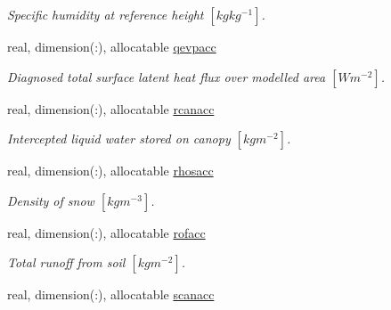 \begin{DoxyCompactItemize}
\begin{DoxyCompactList}\small\item\em Specific humidity at reference height $[kg kg^{-1} ]$. \end{DoxyCompactList}\item 
\hypertarget{structclass__statevars_1_1class__rotated_a32c71cfc01f02871dc4816ba3b4995b8}{}real, dimension(\+:), allocatable \hyperlink{structclass__statevars_1_1class__rotated_a32c71cfc01f02871dc4816ba3b4995b8}{qevpacc}\label{structclass__statevars_1_1class__rotated_a32c71cfc01f02871dc4816ba3b4995b8}

\begin{DoxyCompactList}\small\item\em Diagnosed total surface latent heat flux over modelled area $[W m^{-2} ]$. \end{DoxyCompactList}\item 
\hypertarget{structclass__statevars_1_1class__rotated_a3a6a84b18f6ca8cdd51a59910571645b}{}real, dimension(\+:), allocatable \hyperlink{structclass__statevars_1_1class__rotated_a3a6a84b18f6ca8cdd51a59910571645b}{rcanacc}\label{structclass__statevars_1_1class__rotated_a3a6a84b18f6ca8cdd51a59910571645b}

\begin{DoxyCompactList}\small\item\em Intercepted liquid water stored on canopy $[kg m^{-2} ]$. \end{DoxyCompactList}\item 
\hypertarget{structclass__statevars_1_1class__rotated_a8528443571faf9eca014b634e8a9bd0a}{}real, dimension(\+:), allocatable \hyperlink{structclass__statevars_1_1class__rotated_a8528443571faf9eca014b634e8a9bd0a}{rhosacc}\label{structclass__statevars_1_1class__rotated_a8528443571faf9eca014b634e8a9bd0a}

\begin{DoxyCompactList}\small\item\em Density of snow $[kg m^{-3} ]$. \end{DoxyCompactList}\item 
\hypertarget{structclass__statevars_1_1class__rotated_a833043e6a2d8b67d1c0e301269489ad8}{}real, dimension(\+:), allocatable \hyperlink{structclass__statevars_1_1class__rotated_a833043e6a2d8b67d1c0e301269489ad8}{rofacc}\label{structclass__statevars_1_1class__rotated_a833043e6a2d8b67d1c0e301269489ad8}

\begin{DoxyCompactList}\small\item\em Total runoff from soil $[kg m^{-2} ]$. \end{DoxyCompactList}\item 
\hypertarget{structclass__statevars_1_1class__rotated_a28f8597b119fcdd76a3fb196963f17bc}{}real, dimension(\+:), allocatable \hyperlink{structclass__statevars_1_1class__rotated_a28f8597b119fcdd76a3fb196963f17bc}{scanacc}\label{structclass__statevars_1_1class__rotated_a28f8597b119fcdd76a3fb196963f17bc}


\end{DoxyCompactItemize}
